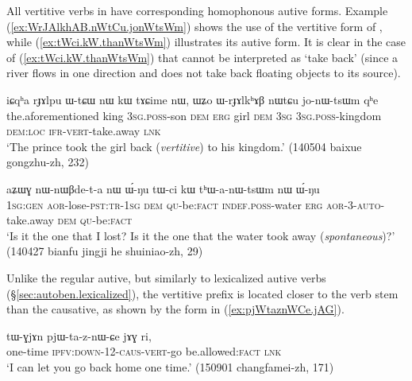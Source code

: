 All vertitive verbs in  have corresponding homophonous autive forms. Example (\ref{ex:WrJAlkhAB.nWtCu.jonWtsWm}) shows the use of the vertitive form of , while (\ref{ex:tWci.kW.thanWtsWm}) illustrates its autive form. It is clear in the case of (\ref{ex:tWci.kW.thanWtsWm}) that  cannot be interpreted as `take back' (since a river flows in one direction and does not take back floating objects to its source).

\begin{exe}
\ex \label{ex:WrJAlkhAB.nWtCu.jonWtsWm}
\gll iɕqʰa rɟɤlpu ɯ-tɕɯ nɯ kɯ tɤɕime nɯ, ɯʑo ɯ-rɟɤlkʰɤβ nɯtɕu jo-nɯ-tsɯm qʰe \\
the.aforementioned king \textsc{3sg}.\textsc{poss}-son \textsc{dem} \textsc{erg} girl \textsc{dem} \textsc{3sg} \textsc{3sg}.\textsc{poss}-kingdom \textsc{dem}:\textsc{loc} \textsc{ifr}-\textsc{vert}-take.away \textsc{lnk} \\
\glt `The prince took the girl back (\textit{vertitive}) to his kingdom.' (140504 baixue gongzhu-zh, 232)
\end{exe}

\begin{exe}
\ex \label{ex:tWci.kW.thanWtsWm}
\gll aʑɯɣ nɯ-nɯβde-t-a nɯ ɯ́-ŋu tɯ-ci kɯ tʰɯ-a-nɯ-tsɯm nɯ ɯ́-ŋu\\
\textsc{1sg}:\textsc{gen} \textsc{aor}-lose-\textsc{pst}:\textsc{tr}-\textsc{1sg} \textsc{dem} \textsc{qu}-be:\textsc{fact} \textsc{indef}.\textsc{poss}-water \textsc{erg} \textsc{aor}-3\flobv{}-\textsc{auto}-take.away \textsc{dem} \textsc{qu}-be:\textsc{fact} \\
\glt `Is it the one that I lost? Is it the one that the water took away (\textit{spontaneous})?' (140427 bianfu jingji he shuiniao-zh, 29)
\end{exe}

Unlike the regular autive, but similarly to lexicalized autive verbs (§\ref{sec:autoben.lexicalized}), the vertitive prefix is located closer to the verb stem than the causative, as shown by the form  in (\ref{ex:pjWtaznWCe.jAG}).

\begin{exe}
\ex \label{ex:pjWtaznWCe.jAG}
\gll  tɯ-ɣjɤn pjɯ-ta-z-nɯ-ɕe jɤɣ ri,  \\
one-time \textsc{ipfv}:\textsc{down}-1\fl{}2-\textsc{caus}-\textsc{vert}-go be.allowed:\textsc{fact} \textsc{lnk} \\
\glt `I can let you go back home one time.' (150901 changfamei-zh, 171)
\end{exe}

